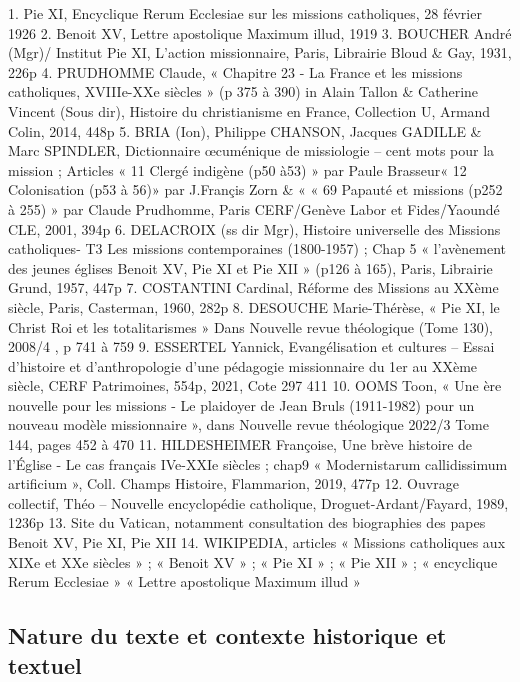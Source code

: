 1.	Pie XI, Encyclique Rerum Ecclesiae sur les missions catholiques, 28 février 1926
2.	Benoit XV, Lettre apostolique Maximum illud, 1919
3.	BOUCHER André (Mgr)/ Institut Pie XI, L’action missionnaire, Paris, Librairie Bloud \& Gay, 1931, 226p
4.	PRUDHOMME Claude, « Chapitre 23 - La France et les missions catholiques, XVIIIe-XXe siècles » (p 375 à 390) in Alain Tallon \& Catherine Vincent (Sous dir), Histoire du christianisme en France, Collection U, Armand Colin, 2014, 448p 
5.	BRIA (Ion), Philippe CHANSON, Jacques GADILLE \& Marc SPINDLER, Dictionnaire œcuménique de missiologie – cent mots pour la mission ; Articles « 11 Clergé indigène (p50 à53) » par Paule Brasseur« 12 Colonisation (p53 à 56)» par J.Françis Zorn \& « « 69 Papauté et missions (p252 à 255) » par Claude Prudhomme, Paris CERF/Genève Labor et Fides/Yaoundé CLE, 2001, 394p
6.	DELACROIX (ss dir Mgr), Histoire universelle des Missions catholiques- T3 Les missions contemporaines (1800-1957) ; Chap 5 « l’avènement des jeunes églises Benoit XV, Pie XI et Pie XII » (p126 à 165), Paris, Librairie Grund, 1957, 447p
7.	COSTANTINI Cardinal, Réforme des Missions au XXème siècle, Paris, Casterman, 1960, 282p
8.	DESOUCHE Marie-Thérèse, « Pie XI, le Christ Roi et les totalitarismes » Dans Nouvelle revue théologique (Tome 130), 2008/4 , p 741 à 759
9.	ESSERTEL Yannick, Evangélisation et cultures – Essai d’histoire et d’anthropologie d’une pédagogie missionnaire du 1er au XXème siècle, CERF Patrimoines, 554p, 2021, Cote 297 411
10.	OOMS Toon, « Une ère nouvelle pour les missions - Le plaidoyer de Jean Bruls (1911-1982) pour un nouveau modèle missionnaire », dans Nouvelle revue théologique 2022/3 Tome 144, pages 452 à 470
11.	HILDESHEIMER Françoise, Une brève histoire de l'Église - Le cas français IVe-XXIe siècles ; chap9 « Modernistarum callidissimum artificium »,  Coll. Champs Histoire, Flammarion, 2019, 477p
12.	Ouvrage collectif, Théo – Nouvelle encyclopédie catholique, Droguet-Ardant/Fayard, 1989, 1236p
13.	Site du Vatican, notamment consultation des biographies des papes Benoit XV, Pie XI, Pie XII
14.	WIKIPEDIA, articles « Missions catholiques aux XIXe et XXe siècles » ; « Benoit XV » ; « Pie XI » ; « Pie XII » ; « encyclique Rerum Ecclesiae » « Lettre apostolique Maximum illud »


\subsection{Nature du texte et contexte historique et textuel}
 

